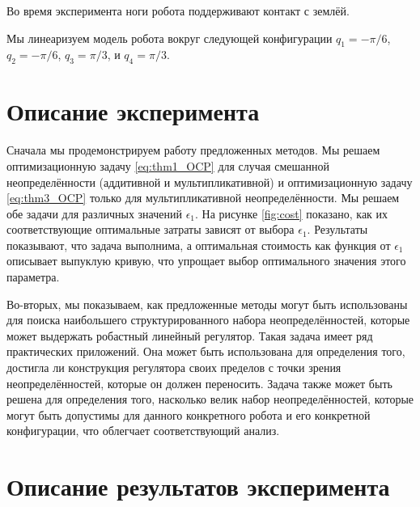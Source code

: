 Во время эксперимента ноги робота поддерживают контакт с землёй.

Мы линеаризуем модель робота вокруг следующей конфигурации $q_1 =- \pi/6$, $q_2 = -\pi / 6$, $q_3 = \pi / 3$, и $q_4 = \pi / 3$.
\section{Описание эксперимента}\label{sec:ch4/sect2}
Сначала мы продемонстрируем работу предложенных методов. Мы решаем оптимизационную задачу \eqref{eq:thm1_OCP} для случая смешанной неопределённости (аддитивной и мультипликативной) и оптимизационную задачу \eqref{eq:thm3_OCP} только для мультипликативной неопределённости. Мы решаем обе задачи для различных значений $\epsilon_1$. На рисунке \ref{fig:cost} показано, как их соответствующие оптимальные затраты зависят от выбора $\epsilon_1$. Результаты показывают, что задача выполнима, а оптимальная стоимость как функция от $\epsilon_1$ описывает выпуклую кривую, что упрощает выбор оптимального значения этого параметра.

Во-вторых, мы показываем, как предложенные методы могут быть использованы для поиска наибольшего структурированного набора неопределённостей, которые может выдержать робастный линейный регулятор. Такая задача имеет ряд практических приложений. Она может быть использована для определения того, достигла ли конструкция регулятора своих пределов с точки зрения неопределённостей, которые он должен переносить. Задача также может быть решена для определения того, насколько велик набор неопределённостей, которые могут быть допустимы для данного конкретного робота и его конкретной конфигурации, что облегчает соответствующий анализ.
\section{Описание результатов эксперимента}\label{sec:ch4/sect3}